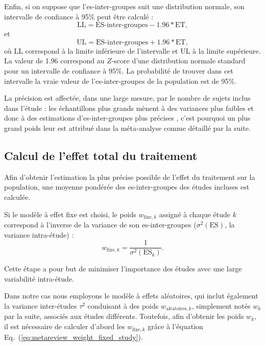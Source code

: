Enfin, si on suppose que l'\gls{es}-inter-groupes suit une distribution normale, son intervalle de confiance à 95\% peut être calculé \citep[Chapitre~8]{Borenstein2009} :
\begin{equation}
\label{eq:metareview_es_between_confidence_interval_95_lower_bound}
\text{LL} = \text{ES-inter-groupes} - 1.96 * \text{ET},
\end{equation}
et 
\begin{equation}
\label{eq:metareview_es_between_confidence_interval_95_upper_bound}
\text{UL} = \text{ES-inter-groupes} + 1.96 * \text{ET},
\end{equation}
où LL correspond à la limite inférieure de l'intervalle et UL à la limite supérieure. La valeur de 1.96 correspond au $Z$-score d'une distribution 
normale standard pour un intervalle de confiance à 95\%. La probabilité de trouver dans cet intervalle
la vraie valeur de l'\gls{es}-inter-groupes de la population est de 95\%.

La précision est affectée, dans une large mesure, par le nombre de sujets inclus dans l'étude : les échantillons plus grands mènent à des
variances plus faibles et donc à des estimations d'\gls{es}-inter-groupes plus précises \citep[Chapitre~8]{Borenstein2009}, c'est pourquoi un plus grand 
poids leur est attribué dans la méta-analyse comme détaillé par la suite.

\subsection{Calcul de l'effet total du traitement} \label{compute_summary_effect}

Afin d'obtenir l'estimation la plus précise possible de l'effet du traitement sur la population, une moyenne pondérée des \gls{es}-inter-groupes 
des études incluses est calculée.

Si le modèle à effet fixe est choisi, le poids $w_{\text{fixe},k}$ assigné à chaque étude $k$ correspond à l'inverse de la variance de son 
\gls{es}-inter-groupes ($\sigma^2(\text{ES})$, la variance intra-étude) \citep[Chapitre~12]{Borenstein2009} :
\begin{equation}
\label{eq:metareview_weight_fixed_study}
w_{\text{fixe},k} = \frac{1}{\sigma^2(\text{ES}_k)}.
\end{equation} 

Cette étape a pour but de minimiser l'importance des études avec une large variabilité intra-étude.

Dans notre cas nous employons le modèle à effets aléatoires, qui inclut également la variance inter-études $\tau^2$ conduisant à des 
poids $w_{\text{aléatoires},k}$, simplement notés $w_k$ par la suite, associés aux études différents.
Toutefois, afin d'obtenir les poids $w_k$, il est nécessaire de calculer d'abord les $w_{\text{fixe},k}$ grâce à l'équation 
Eq.~(\ref{eq:metareview_weight_fixed_study}).

